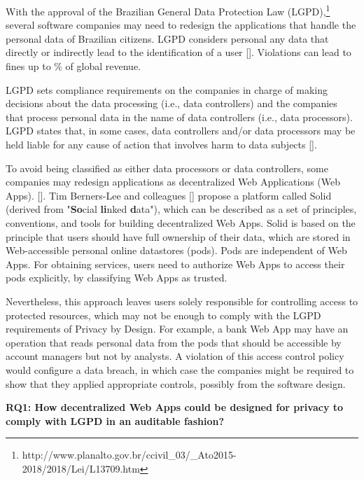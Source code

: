 \documentclass[sigconf]{acmart}
\begin{document}
With the approval of the Brazilian General Data Protection Law (LGPD),\footnote{http://www.planalto.gov.br/ccivil\_03/\_Ato2015-2018/2018/Lei/L13709.htm} several software companies may need to redesign the applications that handle the personal data of Brazilian citizens. LGPD considers personal any data that directly or indirectly lead to the identification of a user []. Violations can lead to fines up to \% of global revenue.

LGPD sets compliance requirements on the companies in charge of making decisions about the data processing (i.e., data controllers) and the companies that process personal data in the name of data controllers (i.e., data processors). LGPD states that, in some cases, data controllers and/or data processors may be held liable for any cause of action that involves harm to data subjects [].

To avoid being classified as either data processors or data controllers, some companies may redesign applications as decentralized Web Applications (Web Apps).  []. Tim Berners-Lee and colleagues [] propose a platform called Solid (derived from "\textbf{So}cial \textbf{li}nked \textbf{d}ata"), which can be described as a set of principles, conventions, and tools for building decentralized Web Apps. Solid is based on the principle that users should have full ownership of their data, which are stored in Web-accessible personal online datastores (pods). Pods are independent of Web Apps. For obtaining services, users need to authorize Web Apps to access their pods explicitly, by classifying Web Apps as trusted.

Nevertheless, this approach leaves users solely responsible for controlling access to protected resources, which may not be \linebreak enough to comply with the LGPD requirements of Privacy by Design. For example, a bank Web App may have an operation that reads personal data from the pods that should be accessible by account managers but not by analysts. A violation of this access control policy would configure a data breach, in which case the companies might be required to show that they applied appropriate controls, possibly from the software design.


\vspace{0.15cm}
\noindent \textbf{RQ1: How decentralized Web Apps could be designed for privacy to comply with LGPD in an auditable fashion?}
\vspace{0.15cm}
\end{document}
